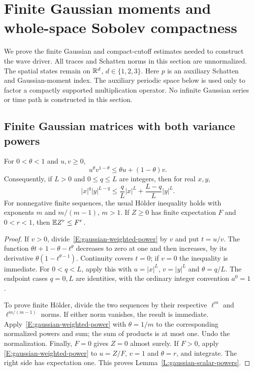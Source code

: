 \section{Finite Gaussian moments and whole-space Sobolev compactness}
\label{S:compact-gaussian}

We prove the finite Gaussian and compact-cutoff estimates needed to
construct the wave driver. All traces and Schatten norms in this section
are unnormalized. The spatial states remain on $\mathbb{R}^d$, $d \in \{1,2,3\}$.
Here $p$ is an auxiliary Schatten and Gaussian-moment index.
The auxiliary periodic space below is used only to factor a compactly
supported multiplication operator. No infinite Gaussian series or time
path is constructed in this section.

\subsection{Finite Gaussian matrices with both variance powers}

\begin{lemma}\label{L:gaussian-scalar-powers}
  For $0 < \theta < 1$ and $u,v \ge 0$,
  \begin{equation}\label{E:gaussian-weighted-power}
    u^\theta v^{1-\theta} \le \theta u+(1-\theta)v.
  \end{equation}
  Consequently, if $L > 0$ and $0 \le q \le L$ are integers, then for
  real $x,y$,
  \begin{equation}\label{E:gaussian-integer-power}
    |x|^q|y|^{L-q}
    \le \frac qL|x|^L+\frac{L-q}L|y|^L.
  \end{equation}
  For nonnegative finite sequences, the usual H\"older inequality holds
  with exponents $m$ and $m/(m-1)$, $m > 1$. If $Z \ge 0$ has finite
  expectation $F$ and $0 < r < 1$, then $\mathbb{E} Z^r \le F^r$.
\end{lemma}

\begin{proof}
  If $v > 0$, divide~\eqref{E:gaussian-weighted-power} by $v$ and put
  $t = u/v$. The function $\theta t+1-\theta-t^\theta$ decreases to zero
  at one and then increases, by its derivative
  $\theta(1-t^{\theta-1})$. Continuity covers $t = 0$; if $v = 0$ the
  inequality is immediate. For $0 < q < L$, apply this with
  $u = |x|^L$, $v = |y|^L$ and $\theta = q/L$. The endpoint cases
  $q = 0,L$ are identities, with the ordinary integer convention $a^0=1$.

  To prove finite H\"older, divide the two sequences by their respective
  $\ell^m$ and $\ell^{m/(m-1)}$ norms. If either norm vanishes, the result
  is immediate. Apply~\eqref{E:gaussian-weighted-power} with
  $\theta = 1/m$ to the corresponding normalized powers and sum; the
  sum of products is at most one. Undo the normalization. Finally,
  $F = 0$ gives $Z = 0$ almost surely. If $F > 0$, apply
  \eqref{E:gaussian-weighted-power} to $u = Z/F$, $v = 1$ and
  $\theta = r$, and integrate. The right side has expectation one.
  This proves Lemma~\ref{L:gaussian-scalar-powers}.
\end{proof}

